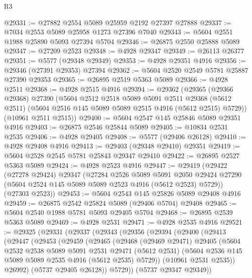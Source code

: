 \begin{lexlean}{R3}
\begin{coremodule}
@29331 := @27882 @2554 @5089 @25959 @2192 @27397 @27888
@29337 := @7034 @2553 @5089 @25958 @1273 @27396 @7040
@29343 := @5604 @2551 @1988 @25890 @5093 @27394 @5704
@29346 := @26875 @2550 @25888 @5089
@29347 := @27209 @2523
@29348 := @4928 @29347
@29349 := @26113 @26377
@29351 := @5577 (@29348 @29349)
@29353 := @4928 @29351 @4916
@29356 := @29346 (@27391 @29353) @27394
@29362 := @5604 @2520 @2549 @5781 @25887 @27390 @29353
@29365 := @26895 @2519 @5363 @5089
@29366 := @4928 @2511
@29368 := @4928 @2515 @4916
@29394 := @29362
    (@29365
      (@29366 @29368)
      @27390
      (@5604
        @2512
        @2518
        @5089
        @5091
        @2511
        @29368
        (@5612 @2511)
        (@5604 @2516 @145 @5089 @5089 @2515 @4916 (@5612 @2515) @5729))
      (@10961 @2511 @2515))
@29400 := @5604 @2547 @145 @25846 @5089 @29351 @4916
@29403 := @26875 @2546 @25844 @5089
@29405 := @10834 @2531 @2535
@29406 := @4928 @29405
@29408 := @5577 (@29406 @26128)
@29410 := @4928 @29408 @4916
@29413 := @29403 (@29348 @29410) @29351
@29419 := @5604 @2528 @2545 @5781 @25843 @29347 @29410
@29422 := @26895 @2527 @5363 @5089
@29424 := @4928 @2523 @4916
@29447 := @29419
    (@29422
      (@27278 @29424)
      @29347
      (@27284
        @2526
        @5089
        @5091
        @2050
        @29424
        @27290
        (@5604 @2524 @145 @5089 @5089 @2523 @4916 (@5612 @2523) @5729))
      (@27303 @2523))
@29453 := @5604 @2543 @145 @25826 @5089 @29408 @4916
@29459 := @26875 @2542 @25824 @5089 (@29406 @5704) @29408
@29465 := @5604 @2540 @1988 @5781 @5093 @29405 @5704
@29468 := @26895 @2539 @5363 @5089
@29469 := @4928 @2531
@29471 := @4928 @2535 @4916
@29521 := @29325
    (@29331
      (@29337
        (@29343
          (@29356
            (@29394
              (@29400
                (@29413
                  (@29447
                    (@29453
                      (@29459
                        (@29465
                          (@29468
                            (@29469 @29471)
                            @29405
                            (@5604
                              @2532
                              @2538
                              @5089
                              @5091
                              @2531
                              @29471
                              (@5612 @2531)
                              (@5604 @2536 @145 @5089 @5089 @2535 @4916 (@5612 @2535) @5729))
                            (@10961 @2531 @2535))
                          @26992)
                        (@5737 @29405 @26128))
                      @5729))
                  (@5737 @29347 @29349))

\end{coremodule}
\end{lexlean}

